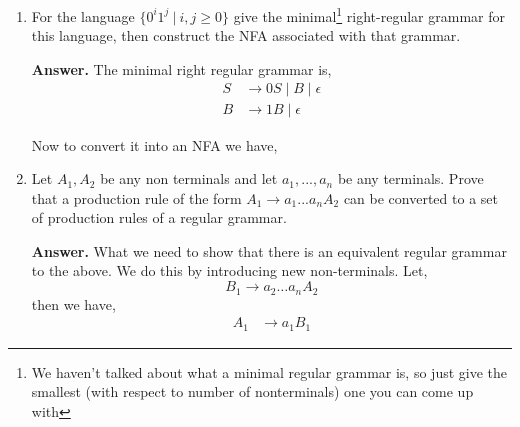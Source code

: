\documentclass[11pt]{article}
\begin{document}
\begin{enumerate}
      \vspace{1em}
      
      (If we assume we have other alphabets as well then in our DFA we just have all the symbols at $q_{0}$ and $q_{1}$ except $0$ go to itself which just corresponds $\delta(q_{1}, a) = q_{1}$  which is the production $A\to a A$ for $a \ne 0$ and $\delta(q_{0}, a) = q_{0}$ which is $S \to aS$ for $a \ne 0$ and as $S$ is the end state we also have $S \to a$ for $a \ne 0$)

    \item For the language $\{0^i1^j ~|~ i, j \geq 0\}$ give the minimal\footnote{We haven't talked about what a minimal regular grammar is, so just give the smallest (with respect to number of nonterminals) one you can come up with} right-regular grammar for this language, then construct the NFA associated with that grammar. 

      \textbf{Answer. } The minimal right regular grammar is, 
      \begin{align*}
        S &\to 0S \mid B \mid \epsilon\\
        B &\to 1B \mid \epsilon
      \end{align*}

      Now to convert it into an NFA we have,
\begin{center}
\end{center}

    \item Let $A_1,A_2$ be any non terminals and let $a_1,...,a_n$ be any terminals. Prove that a production rule of the form $A_1 \rightarrow a_1...a_nA_2$ can be converted to a set of production rules of a regular grammar. 

      \textbf{Answer. } What we need to show that there is an equivalent regular grammar to the above. We do this by introducing new non-terminals. Let, 
      \[
        B_1 \to a_{2} \dots a_n A_{2}
      \]
      then we have, 
      \begin{align*}
        A_{1} &\to a_{1} B_{1}
      \end{align*}


\end{enumerate}
\end{document}
